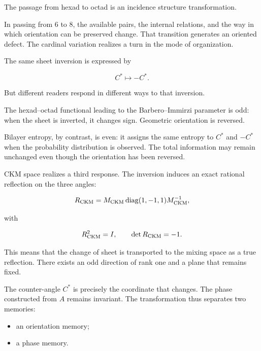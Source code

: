 The passage from hexad to octad is an incidence structure transformation.\par

In passing from \(6\) to \(8\), the available pairs, the internal relations, and the way in which orientation can be preserved change. That transition generates an oriented defect. The cardinal variation realizes a turn in the mode of organization.\par

The same sheet inversion is expressed by\par

\[
C^*\longmapsto -C^*.
\]

But different readers respond in different ways to that inversion.\par

The hexad–octad functional leading to the Barbero–Immirzi parameter is odd:
when the sheet is inverted, it changes sign. Geometric orientation is
reversed.\par

Bilayer entropy, by contrast, is even: it assigns the same entropy to \(C^*\) and \(-C^*\) when the probability distribution is observed. The total information may remain unchanged even though the orientation has been reversed.\par

CKM space realizes a third response. The inversion induces an exact rational reflection on the three angles:\par

\[
R_{\rm CKM}
=
M_{\rm CKM}
\operatorname{diag}(1,-1,1)
M_{\rm CKM}^{-1},
\]

with\par

\[
R_{\rm CKM}^2=I,
\qquad
\det R_{\rm CKM}=-1.
\]

This means that the change of sheet is transported to the mixing space as a true reflection. There exists an odd direction of rank one and a plane that remains fixed.\par

The counter-angle \(C^*\) is precisely the coordinate that changes. The phase constructed from \(A\) remains invariant. The transformation thus separates two memories:\par

\begin{itemize}[leftmargin=*,itemsep=0.35em]
\item an orientation memory;
\item a phase memory.
\end{itemize}

